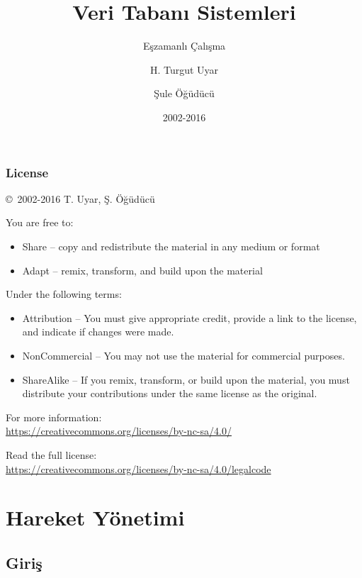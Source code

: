 \documentclass[dvipsnames]{beamer}
\title{Veri Tabanı Sistemleri}
\subtitle{Eşzamanlı Çalışma}
\author{H. Turgut Uyar \and Şule Öğüdücü}
\date{2002-2016}
\theoremstyle{plain}
\begin{document}
\begin{frame}
  \titlepage
\end{frame}

\begin{frame}
 \frametitle{License}

  \hfill
  \copyright~2002-2016 T. Uyar, Ş. Öğüdücü

  \vfill
  \begin{footnotesize}
    You are free to:
    \begin{itemize}
      \itemsep0em
      \item Share -- copy and redistribute the material in any medium or format
      \item Adapt -- remix, transform, and build upon the material
    \end{itemize}

    Under the following terms:
    \begin{itemize}
      \itemsep0em
      \item Attribution -- You must give appropriate credit, provide a link to
        the license, and indicate if changes were made.

      \item NonCommercial -- You may not use the material for commercial
        purposes.

      \item ShareAlike -- If you remix, transform, or build upon the material,
        you must distribute your contributions under the same license as the
        original.
    \end{itemize}
  \end{footnotesize}

  \begin{small}
    For more information:\\
    \url{https://creativecommons.org/licenses/by-nc-sa/4.0/}

    \smallskip
    Read the full license:\\
    \url{https://creativecommons.org/licenses/by-nc-sa/4.0/legalcode}
  \end{small}
\end{frame}

\section{Hareket Yönetimi}

\subsection{Giriş}
\end{document}
